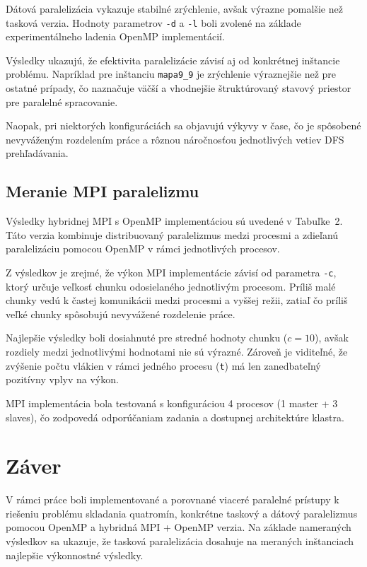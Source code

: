 \documentclass[a4paper]{article}
\begin{document}


Dátová paralelizácia vykazuje stabilné zrýchlenie, avšak výrazne pomalšie než tasková verzia. 
Hodnoty parametrov \texttt{-d} a \texttt{-l} boli zvolené na základe experimentálneho ladenia OpenMP implementácií.


Výsledky ukazujú, že efektivita paralelizácie závisí aj od konkrétnej inštancie problému. 
Napríklad pre inštanciu \texttt{mapa9\_9} je zrýchlenie výraznejšie než pre ostatné prípady, čo naznačuje väčší a vhodnejšie štruktúrovaný stavový priestor pre paralelné spracovanie.

Naopak, pri niektorých konfiguráciách sa objavujú výkyvy v čase, čo je spôsobené nevyváženým rozdelením práce a rôznou náročnosťou jednotlivých vetiev DFS prehľadávania.

\subsection{Meranie MPI paralelizmu}
Výsledky hybridnej MPI s OpenMP implementáciou sú uvedené v Tabuľke~2. 
Táto verzia kombinuje distribuovaný paralelizmus medzi procesmi a zdieľanú paralelizáciu pomocou OpenMP v rámci jednotlivých procesov.

Z výsledkov je zrejmé, že výkon MPI implementácie závisí od parametra \texttt{-c}, ktorý určuje veľkosť chunku odosielaného jednotlivým procesom. 
Príliš malé chunky vedú k častej komunikácii medzi procesmi a vyššej režii, zatiaľ čo príliš veľké chunky spôsobujú nevyvážené rozdelenie práce.

Najlepšie výsledky boli dosiahnuté pre stredné hodnoty chunku ($c = 10$), avšak rozdiely medzi jednotlivými hodnotami nie sú výrazné.
Zároveň je viditeľné, že zvýšenie počtu vlákien v rámci jedného procesu (\texttt{t}) má len zanedbateľný pozitívny vplyv na výkon.

MPI implementácia bola testovaná s konfiguráciou 4 procesov (1 master + 3 slaves), čo zodpovedá odporúčaniam zadania a dostupnej architektúre klastra.




\section{Záver}

V rámci práce boli implementované a porovnané viaceré paralelné prístupy k riešeniu problému skladania quatromín, konkrétne taskový a dátový paralelizmus pomocou OpenMP a hybridná MPI + OpenMP verzia.
Na základe nameraných výsledkov sa ukazuje, že tasková paralelizácia dosahuje na meraných inštanciach najlepšie výkonnostné výsledky.
\end{document}
